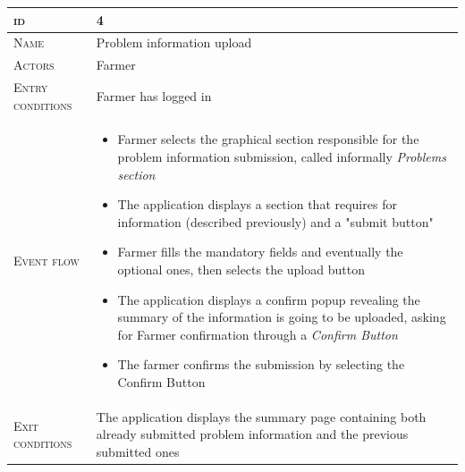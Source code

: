 \begin{table}[H]
    \centering
    \begin{tabular}{|l|p{}|}
        \hline %
    	\textsc{id}                 &   4\\
    	\hline %
    	\textsc{Name}               &   Problem information upload\\
    	\hline %
    	\textsc{Actors}             &   Farmer\\
    	\hline %
    	\textsc{Entry conditions}   &   Farmer has logged in\\
    	\hline %
    	\textsc{Event flow}         &   %
            	                        \begin{itemize}
                                    	    \item Farmer selects the graphical section responsible for the problem information submission, called informally \textit{Problems section}
                                    		\item The application displays a section that requires for information (described previously) and a "submit button"
                                    		\item Farmer fills the mandatory fields and eventually the optional ones, then selects the upload button
                                    		\item The application displays a confirm popup revealing the summary of the information is going to be uploaded, asking for Farmer confirmation through a \textit{Confirm Button}
                                    		\item The farmer confirms the submission by selecting the Confirm Button
                                        \end{itemize}\\
        \hline %
        \textsc{Exit conditions}    &  The application displays the summary page containing both already submitted problem information and the previous submitted ones\\
    	\hline %

\end{tabular}
\end{table}
